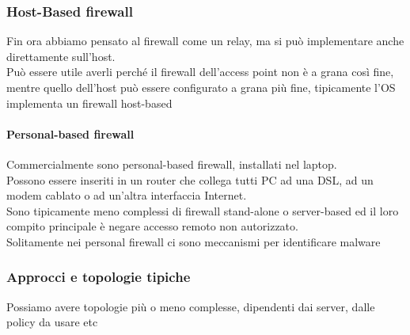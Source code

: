 \documentclass[12pt, oneside]{extbook} %
\begin{document}
\subsubsection{Host-Based firewall}
Fin ora abbiamo pensato al firewall come un relay, ma si può implementare anche direttamente sull'host.
\\Può essere utile averli perché il firewall dell'access point non è a grana così fine, mentre quello dell'host può essere configurato a grana più fine, tipicamente l'OS implementa un firewall host-based

\paragraph{Personal-based firewall} Commercialmente sono personal-based firewall, installati nel laptop.
\\Possono essere inseriti in un router che collega tutti PC ad una DSL, ad un modem cablato o ad un'altra interfaccia Internet.
\\Sono tipicamente meno complessi di firewall stand-alone o server-based ed il loro compito principale è negare accesso remoto non autorizzato.
\\Solitamente nei personal firewall ci sono meccanismi per identificare malware

\subsubsection{Approcci e topologie tipiche}
Possiamo avere topologie più o meno complesse, dipendenti dai server, dalle policy da usare etc
\end{document}
